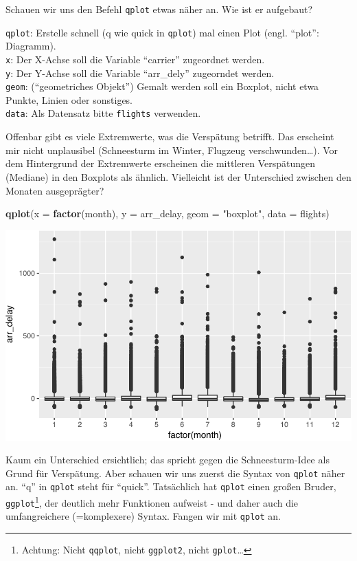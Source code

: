 \documentclass[12pt,ngerman,]{book}
\newenvironment{Shaded}{\begin{snugshade}}{\end{snugshade}}
\newcommand{\KeywordTok}[1]{\textcolor[rgb]{0.13,0.29,0.53}{\textbf{{#1}}}}
\newcommand{\DataTypeTok}[1]{\textcolor[rgb]{0.13,0.29,0.53}{{#1}}}
\newcommand{\StringTok}[1]{\textcolor[rgb]{0.31,0.60,0.02}{{#1}}}
\newcommand{\NormalTok}[1]{{#1}}
\let\rmarkdownfootnote\footnote%
\def\footnote{\protect\rmarkdownfootnote}
\renewenvironment{Shaded}{\begin{kframe}}{\end{kframe}}
\let\BeginKnitrBlock\begin \let\EndKnitrBlock\end
\begin{document}
Schauen wir uns den Befehl \texttt{qplot} etwas näher an. Wie ist er
aufgebaut?

\BeginKnitrBlock{rmdpseudocode}
\texttt{qplot}: Erstelle schnell (q wie quick in \texttt{qplot}) mal
einen Plot (engl. ``plot'': Diagramm).\\
\texttt{x}: Der X-Achse soll die Variable ``carrier'' zugeordnet
werden.\\
\texttt{y}: Der Y-Achse soll die Variable ``arr\_dely'' zugeorndet
werden.\\
\texttt{geom}: (``geometriches Objekt'') Gemalt werden soll ein Boxplot,
nicht etwa Punkte, Linien oder sonstiges.\\
\texttt{data}: Als Datensatz bitte \texttt{flights} verwenden.
\EndKnitrBlock{rmdpseudocode}

Offenbar gibt es viele Extremwerte, was die Verspätung betrifft. Das
erscheint mir nicht unplausibel (Schneesturm im Winter, Flugzeug
verschwunden\ldots{}). Vor dem Hintergrund der Extremwerte erscheinen
die mittleren Verspätungen (Mediane) in den Boxplots als ähnlich.
Vielleicht ist der Unterschied zwischen den Monaten ausgeprägter?

\begin{Shaded}
\begin{Highlighting}[]
\KeywordTok{qplot}\NormalTok{(}\DataTypeTok{x =} \KeywordTok{factor}\NormalTok{(month), }\DataTypeTok{y =} \NormalTok{arr_delay, }\DataTypeTok{geom =} \StringTok{"boxplot"}\NormalTok{, }\DataTypeTok{data =} \NormalTok{flights)}
\end{Highlighting}
\end{Shaded}

\begin{center}\includegraphics[width=0.7\linewidth]{050_Daten_visualisieren_files/figure-latex/unnamed-chunk-4-1} \end{center}

Kaum ein Unterschied ersichtlich; das spricht gegen die Schneesturm-Idee
als Grund für Verspätung. Aber schauen wir uns zuerst die Syntax von
\texttt{qplot} näher an. ``q'' in \texttt{qplot} steht für ``quick''.
Tatsächlich hat \texttt{qplot} einen großen Bruder,
\texttt{ggplot}\footnote{Achtung: Nicht \texttt{qqplot}, nicht
  \texttt{ggplot2}, nicht \texttt{gplot}\ldots{}}, der deutlich mehr
Funktionen aufweist - und daher auch die umfangreichere (=komplexere)
Syntax. Fangen wir mit \texttt{qplot} an.
\end{document}
